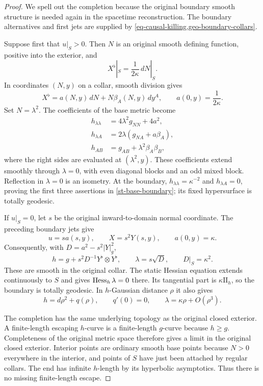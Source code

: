 \begin{proof}
We spell out the completion because the original boundary smooth
structure is needed again in the spacetime reconstruction.  The
boundary alternatives and first jets are supplied by
\cref{eq-causal-killing,geo-boundary-collars}.

Suppose first that $u|_S>0$.  Then $N$ is an original smooth defining
function, positive into the exterior, and
\[
 X^\flat|_S=\frac1{2\kappa}\,dN|_S.
\]
In coordinates $(N,y)$ on a collar, smooth division gives
\[
 X^\flat=a(N,y)\,dN+N\beta_A(N,y)\,dy^A,
 \qquad a(0,y)=\frac1{2\kappa}.
\]
Set $N=\lambda^2$.  The coefficients of the base metric become
\begin{equation}
 \begin{split}
 h_{\lambda\lambda}&=4\lambda^2 g_{NN}+4a^2,\\
 h_{\lambda A}&=2\lambda(g_{NA}+a\beta_A),\\
 h_{AB}&=g_{AB}+\lambda^2\beta_A\beta_B,
 \end{split}
 \label{st-even-collar}
\end{equation}
where the right sides are evaluated at $(\lambda^2,y)$.  These
coefficients extend smoothly through $\lambda=0$, with even diagonal
blocks and an odd mixed block.  Reflection in $\lambda=0$ is an
isometry.  At the boundary, $h_{\lambda\lambda}=\kappa^{-2}$ and
$h_{\lambda A}=0$, proving the first three assertions in
\eqref{st-base-boundary}; its fixed hypersurface is totally geodesic.

If $u|_S=0$, let $s$ be the original inward-to-domain normal
coordinate.  The preceding boundary jets give
\[
 u=s a(s,y),\qquad X=s^2Y(s,y),\qquad a(0,y)=\kappa.
\]
Consequently, with $D=a^2-s^2|Y|_g^2$,
\[
 h=g+s^2D^{-1}Y^\flat\otimes Y^\flat,
 \qquad \lambda=s\sqrt D,
 \qquad D|_S=\kappa^2.
\]
These are smooth in the original collar.  The static Hessian equation
extends continuously to $S$ and gives $\operatorname{Hess}_h\lambda=0$ there.  Its
tangential part is $\kappa\mathrm{II}_h$, so the boundary is totally
geodesic.  In $h$-Gaussian distance $\rho$ it also gives
\begin{equation}
 h=d\rho^2+q(\rho),\qquad q'(0)=0,
 \qquad \lambda=\kappa\rho+O(\rho^3).
 \label{st-gaussian-boundary-jets}
\end{equation}

The completion has the same underlying topology as the original
closed exterior.  A finite-length escaping $h$-curve is a finite-length
$g$-curve because $h\geq g$.  Completeness of the original metric space
therefore gives a limit in the original closed exterior.  Interior
points are ordinary smooth base points because $N>0$ everywhere in the
interior, and points of $S$ have just been attached by regular collars.
The end has infinite $h$-length by its hyperbolic asymptotics.  Thus
there is no missing finite-length escape.


\end{proof}
